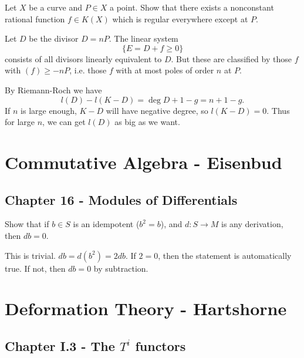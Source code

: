 \documentclass[11pt, english]{article}
\begin{document}
\begin{exc}[Exercise 1.1]
Let $X$ be a curve and $P \in X$ a point. Show that there exists a nonconstant rational function $f \in K(X)$ which is regular everywhere except at $P$.
\end{exc}
\begin{sol}
Let $D$ be the divisor $D=nP$. The linear system 
$$
\{ E = D + f \geq 0 \}
$$
consists of all divisors linearly equivalent to $D$. But these are classified by those $f$ with $(f) \geq -nP$, i.e. those $f$ with at most poles of order $n$ at $P$.

By Riemann-Roch we have
$$
l(D)-l(K-D) = \deg D +1 -g = n+1-g.
$$
If $n$ is large enough, $K-D$ will have negative degree, so $l(K-D)=0$. Thus for large $n$, we can get $l(D)$ as big as we want.

\end{sol}

\section{Commutative Algebra - Eisenbud}

\subsection{Chapter 16 - Modules of Differentials}
\begin{exc}[Exercise 16.1]
Show that if $b \in S$ is an idempotent ($b^2=b$), and $d:S \to M$ is any derivation, then $db=0$.  
\end{exc}
\begin{sol}
This is trivial. $db=d(b^2)=2db$. If $2=0$, then the statement is automatically true. If not, then $db=0$ by subtraction. 
\end{sol}

\section{Deformation Theory - Hartshorne}

\subsection{Chapter I.3 - The $T^i$ functors}
\end{document}
